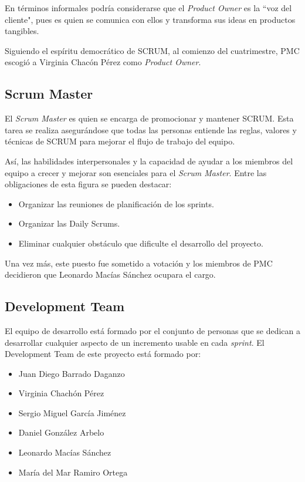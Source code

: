 \documentclass[../DocumentoOficial.tex]{subfiles}
\begin{document}
En términos informales podría considerarse que el \textit{Product Owner} es la ``voz del cliente", pues es quien se comunica con ellos y transforma sus ideas en productos tangibles.

Siguiendo el espíritu democrático de SCRUM, al comienzo del cuatrimestre, PMC escogió a Virginia Chacón Pérez como \textit{Product Owner}.

\subsection{Scrum Master}
El \textit{Scrum Master} es quien se encarga de promocionar y mantener  SCRUM. Esta tarea se realiza asegurándose que todas las personas entiende las reglas, valores y técnicas de SCRUM para mejorar el flujo de trabajo del equipo.

Así, las habilidades interpersonales y la capacidad de ayudar a los miembros del equipo a crecer y mejorar son esenciales para el \textit{Scrum Master}. Entre las obligaciones de esta figura se pueden destacar:
\begin{itemize}
\item Organizar las reuniones de planificación de los sprints.
\item Organizar las Daily Scrums.
\item Eliminar cualquier obstáculo que dificulte el desarrollo del proyecto.
\end{itemize}

Una vez más, este puesto fue sometido a votación y los miembros de PMC decidieron que Leonardo Macías Sánchez ocupara el cargo.

\subsection{Development Team}
El equipo de desarrollo está formado por el conjunto de personas que se dedican a desarrollar cualquier aspecto de un incremento usable en cada \textit{sprint}. El Development Team de este proyecto está formado por:
\begin{itemize}
\item Juan Diego Barrado Daganzo
\item Virginia Chachón Pérez
\item Sergio Miguel García Jiménez
\item Daniel González Arbelo
\item Leonardo Macías Sánchez
\item María del Mar Ramiro Ortega
\end{itemize}
\end{document}
